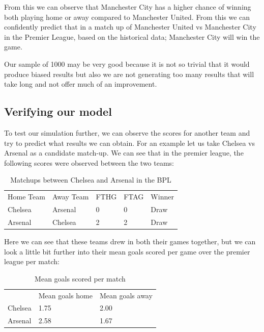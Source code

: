 \documentclass[11pt]{report}
\begin{document}
\vspace{0.3cm}
\noindent
From this we can observe that Manchester City has a higher chance of winning both playing home or away compared to Manchester United. From this we can confidently predict that in a match up of Manchester United vs Manchester City in the Premier League, based on the historical data; Manchester City will win the game.

\vspace{0.3cm}
\noindent
Our sample of 1000 may be very good because it is not so trivial that it would produce biased results but also we are not generating too many results that will take long and not offer much of an improvement. 

\newpage
\vspace{0.3cm}
\noindent
\subsection{Verifying our model} 

\noindent
To test our simulation further, we can observe the scores for another team and try to predict what results we can obtain. For an example let us take Chelsea vs Arsenal as a candidate match-up. We can see that in the premier league, the following scores were observed between the two teams:

\vspace{0.3cm}

\begin{table}[ht]
\centering
\caption{Matchups between Chelsea and Arsenal in the BPL}
\label{t4}
\begin{tabular}{lllll}
Home Team & Away Team & FTHG & FTAG & Winner \\
Chelsea   & Arsenal   & 0    & 0    & Draw   \\
Arsenal   & Chelsea   & 2    & 2    & Draw  
\end{tabular}
\end{table}

\noindent
Here we can see that these teams drew in both their games together, but we can look a little bit further into their mean goals scored per game over the premier league per match:

\vspace{0.3cm}

\begin{table}[ht]
\centering
\caption{Mean goals scored per match}
\label{t5}
\begin{tabular}{lll}
        & Mean goals home & Mean goals away \\
Chelsea & 1.75            & 2.00            \\
Arsenal & 2.58            & 1.67           
\end{tabular}
\end{table}
\end{document}
